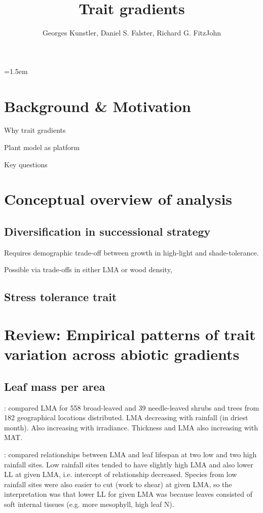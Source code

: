 \documentclass[a4paper,11pt]{article}
\title{Trait gradients}
\author{ Georges Kunstler, Daniel S. Falster, Richard G. FitzJohn}
\date{}
\affiliation{Department of Biological Sciences, Macquarie University,
  Sydney, Australia}
\begin{document}
\mstitleshort
\parindent=1.5em
\addtolength{\parskip}{.3em}


\section{Background \& Motivation}

Why trait gradients

Plant model as platform \citep{Falster-2016}

Key questions

\section{Conceptual overview of analysis}

\subsection{Diversification in successional strategy}

Requires demographic trade-off between growth in high-light and shade-tolerance.

Possible via trade-offs in either LMA or wood density,

\subsection{Stress tolerance trait}


\section{Review: Empirical patterns of trait variation across abiotic
gradients}


\subsection{Leaf mass per area}

\citet{Niinemets-2001}: compared LMA for 558 broad-leaved and 39 needle-leaved shrubs and trees from 182 geographical locations distributed. LMA decreasing with rainfall (in driest month). Also increasing with irradiance. Thickness and LMA also increasing with MAT.

\citet{Wright-2002}: compared relationships between LMA and leaf lifespan at two low and two high rainfall sites. Low rainfall sites tended to have slightly high LMA and also lower LL at given LMA, i.e. intercept of relationship decreased. Species from low rainfall sites were also easier to cut (work to shear) at given LMA, so the interpretation was that lower LL for given LMA was because leaves consisted of soft internal tissues (e.g. more mesophyll, high leaf N).
\end{document}
